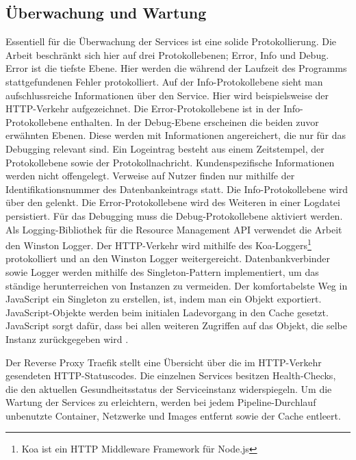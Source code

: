 \subsection{Überwachung und Wartung}
\label{subsec:ueberwachungundwartung}
Essentiell für die Überwachung der Services ist eine solide Protokollierung.
Die Arbeit beschränkt sich hier auf drei Protokollebenen; Error, Info und Debug.
Error ist die tiefste Ebene. Hier werden die während der Laufzeit des Programms
stattgefundenen Fehler protokolliert. Auf der Info-Protokollebene sieht man
aufschlussreiche Informationen über den Service. Hier wird beispielsweise
der HTTP-Verkehr aufgezeichnet. Die Error-Protokollebene ist in der Info-Protokollebene
enthalten. In der Debug-Ebene erscheinen die beiden zuvor erwähnten Ebenen. Diese
werden mit Informationen angereichert, die nur für das Debugging relevant sind.
Ein Logeintrag besteht aus einem Zeitstempel, der Protokollebene sowie der Protokollnachricht.
Kundenspezifische Informationen werden nicht offengelegt. Verweise auf Nutzer finden nur
mithilfe der Identifikationsnummer des Datenbankeintrags statt. Die Info-Protokollebene
wird über den  gelenkt. Die Error-Protokollebene wird des Weiteren in einer
Logdatei persistiert. Für das Debugging muss die Debug-Protokollebene aktiviert werden.
Als Logging-Bibliothek für die Resource Management API verwendet die Arbeit den Winston
Logger. Der HTTP-Verkehr wird mithilfe des Koa-Loggers\footnote{Koa ist ein HTTP Middleware Framework für Node.js} protokolliert und an den Winston
Logger weitergereicht. Datenbankverbinder sowie Logger werden mithilfe des Singleton-Pattern
implementiert, um das ständige herunterreichen von Instanzen zu vermeiden. Der komfortabelste
Weg in JavaScript ein Singleton zu erstellen, ist, indem man ein Objekt exportiert. JavaScript-Objekte
werden beim initialen Ladevorgang in den Cache gesetzt. JavaScript sorgt dafür,
dass bei allen weiteren Zugriffen auf das Objekt, die selbe Instanz zurückgegeben wird \cite{NodeJsCaching}.

Der Reverse Proxy Traefik stellt eine Übersicht über die im HTTP-Verkehr gesendeten 
HTTP-Statuscodes. Die einzelnen Services besitzen Health-Checks, die den aktuellen
Gesundheitsstatus der Serviceinstanz widerspiegeln. Um die Wartung der Services zu erleichtern,
werden bei jedem Pipeline-Durchlauf unbenutzte Container, Netzwerke und Images
entfernt sowie der Cache entleert.


